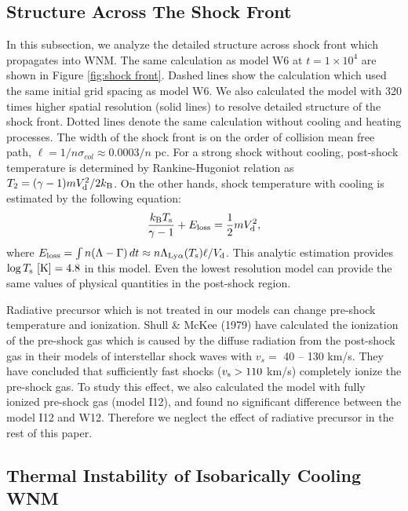 \subsection{Structure Across The Shock Front}

In this subsection, we analyze the detailed structure across
shock front which propagates into WNM.
The same calculation as model W6 at $t=1\times 10^4$ are shown in
Figure \ref{fig:shock front}.
Dashed lines show the calculation 
which used the same initial grid spacing as model W6.
We also calculated the model with 320 times higher spatial resolution
(solid lines) to resolve detailed structure of the shock front.
Dotted lines denote the same calculation without cooling and heating 
processes.
The width of the shock front is on the order of collision mean free path,
$\ell=1/n\sigma_{col}\approx 0.0003/n$ pc.
For a strong shock without cooling, post-shock temperature
is determined by Rankine-Hugoniot relation as 
$T_2=(\gamma-1)mV^2_{\rm d}/2k_{\rm B}$.
On the other hands, 
shock temperature with cooling is estimated by the following equation: 
\begin{equation}
\frac{k_{\rm B}T_{\rm s}}{\gamma-1}+E_{\rm loss}=\frac{1}{2}mV^2_{\rm d},
\end{equation}
where 
$E_{\rm loss}=\int n(\Lambda-\Gamma)\, dt
\approx n\Lambda_{\rm Ly\alpha}(T_{\rm s}) \ell/V_{\rm d}$.
This analytic estimation provides $\log T_{\rm s} \ {\rm [K]}=4.8$ in
this model. 
Even the lowest resolution model can provide the same values of 
physical quantities in the post-shock region.  

Radiative precursor which is not treated in our models can change 
pre-shock temperature and ionization.
Shull \& McKee (1979) have calculated the ionization of the pre-shock
gas which is caused by the diffuse radiation from the post-shock
gas in their models of interstellar shock waves with $v_s=$ 40 -- 130 km/s. 
They have concluded that sufficiently fast shocks ($v_{\rm s}>110$ km/s)
completely ionize the pre-shock gas.
To study this effect,
we also calculated the model with fully ionized pre-shock gas (model I12),
and found no significant difference between the model I12 and W12.
Therefore we neglect the effect of radiative precursor in the rest of
this paper.

\subsection{Thermal Instability of Isobarically Cooling WNM}

